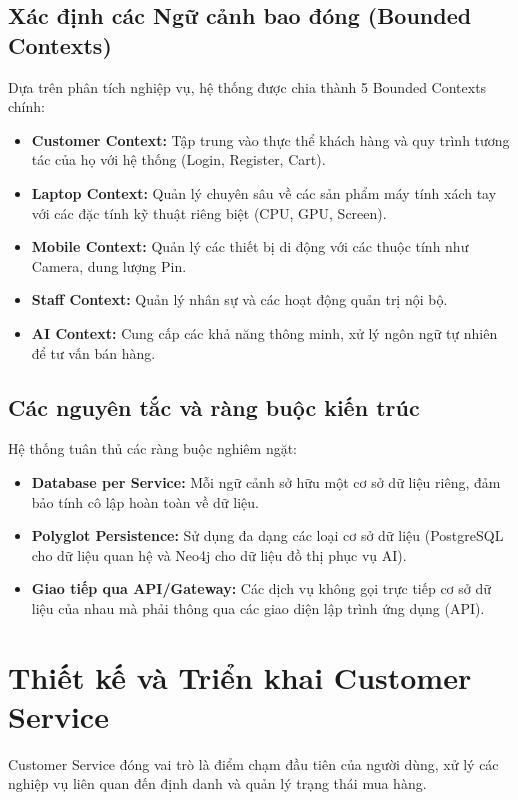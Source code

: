 \documentclass[12pt,a4paper]{report}
\begin{document}
\subsection{Xác định các Ngữ cảnh bao đóng (Bounded Contexts)}
Dựa trên phân tích nghiệp vụ, hệ thống được chia thành 5 Bounded Contexts chính:
\begin{itemize}
    \item \textbf{Customer Context:} Tập trung vào thực thể khách hàng và quy trình tương tác của họ với hệ thống (Login, Register, Cart).
    \item \textbf{Laptop Context:} Quản lý chuyên sâu về các sản phẩm máy tính xách tay với các đặc tính kỹ thuật riêng biệt (CPU, GPU, Screen).
    \item \textbf{Mobile Context:} Quản lý các thiết bị di động với các thuộc tính như Camera, dung lượng Pin.
    \item \textbf{Staff Context:} Quản lý nhân sự và các hoạt động quản trị nội bộ.
    \item \textbf{AI Context:} Cung cấp các khả năng thông minh, xử lý ngôn ngữ tự nhiên để tư vấn bán hàng.
\end{itemize}

\subsection{Các nguyên tắc và ràng buộc kiến trúc}
Hệ thống tuân thủ các ràng buộc nghiêm ngặt:
\begin{itemize}
    \item \textbf{Database per Service:} Mỗi ngữ cảnh sở hữu một cơ sở dữ liệu riêng, đảm bảo tính cô lập hoàn toàn về dữ liệu.
    \item \textbf{Polyglot Persistence:} Sử dụng đa dạng các loại cơ sở dữ liệu (PostgreSQL cho dữ liệu quan hệ và Neo4j cho dữ liệu đồ thị phục vụ AI).
    \item \textbf{Giao tiếp qua API/Gateway:} Các dịch vụ không gọi trực tiếp cơ sở dữ liệu của nhau mà phải thông qua các giao diện lập trình ứng dụng (API).
\end{itemize}

\section{Thiết kế và Triển khai Customer Service}
Customer Service đóng vai trò là điểm chạm đầu tiên của người dùng, xử lý các nghiệp vụ liên quan đến định danh và quản lý trạng thái mua hàng.
\end{document}
